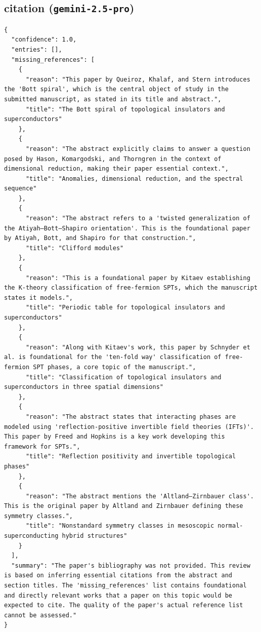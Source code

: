 \documentclass[11pt]{article}
\begin{document}
\subsection*{citation (\texttt{gemini-2.5-pro})}
\begin{verbatim}
{
  "confidence": 1.0,
  "entries": [],
  "missing_references": [
    {
      "reason": "This paper by Queiroz, Khalaf, and Stern introduces the 'Bott spiral', which is the central object of study in the submitted manuscript, as stated in its title and abstract.",
      "title": "The Bott spiral of topological insulators and superconductors"
    },
    {
      "reason": "The abstract explicitly claims to answer a question posed by Hason, Komargodski, and Thorngren in the context of dimensional reduction, making their paper essential context.",
      "title": "Anomalies, dimensional reduction, and the spectral sequence"
    },
    {
      "reason": "The abstract refers to a 'twisted generalization of the Atiyah–Bott–Shapiro orientation'. This is the foundational paper by Atiyah, Bott, and Shapiro for that construction.",
      "title": "Clifford modules"
    },
    {
      "reason": "This is a foundational paper by Kitaev establishing the K-theory classification of free-fermion SPTs, which the manuscript states it models.",
      "title": "Periodic table for topological insulators and superconductors"
    },
    {
      "reason": "Along with Kitaev's work, this paper by Schnyder et al. is foundational for the 'ten-fold way' classification of free-fermion SPT phases, a core topic of the manuscript.",
      "title": "Classification of topological insulators and superconductors in three spatial dimensions"
    },
    {
      "reason": "The abstract states that interacting phases are modeled using 'reflection-positive invertible field theories (IFTs)'. This paper by Freed and Hopkins is a key work developing this framework for SPTs.",
      "title": "Reflection positivity and invertible topological phases"
    },
    {
      "reason": "The abstract mentions the 'Altland–Zirnbauer class'. This is the original paper by Altland and Zirnbauer defining these symmetry classes.",
      "title": "Nonstandard symmetry classes in mesoscopic normal-superconducting hybrid structures"
    }
  ],
  "summary": "The paper's bibliography was not provided. This review is based on inferring essential citations from the abstract and section titles. The 'missing_references' list contains foundational and directly relevant works that a paper on this topic would be expected to cite. The quality of the paper's actual reference list cannot be assessed."
}
\end{verbatim}
\end{document}
